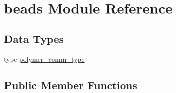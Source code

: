 \hypertarget{classbeads}{\section{beads Module Reference}
\label{classbeads}
}
\subsection*{Data Types}
\begin{DoxyCompactItemize}
\item 
type \hyperlink{structbeads_1_1polymer__comm__type}{polymer\-\_\-comm\-\_\-type}
\end{DoxyCompactItemize}
\subsection*{Public Member Functions}
